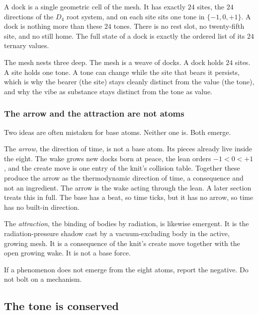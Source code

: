 \begin{definition}[A dock]
A dock is a single geometric cell of the mesh. It has exactly $24$ sites, the $24$ directions of the $D_4$ root system, and on each site sits one tone in $\{-1, 0, +1\}$. A dock is nothing more than these $24$ tones. There is no rest slot, no twenty-fifth site, and no still home. The full state of a dock is exactly the ordered list of its $24$ ternary values.
\end{definition}

The mesh nests three deep. The mesh is a weave of docks. A dock holds $24$ sites. A site holds one tone. A tone can change while the site that bears it persists, which is why the bearer (the site) stays cleanly distinct from the value (the tone), and why the vibe as substance stays distinct from the tone as value.

\subsubsection{The arrow and the attraction are not atoms}

Two ideas are often mistaken for base atoms. Neither one is. Both emerge.

The \emph{arrow}, the direction of time, is not a base atom. Its pieces already live inside the eight. The wake grows new docks born at peace, the lean orders $-1 < 0 < +1$, and the create move is one entry of the knit's collision table. Together these produce the arrow as the thermodynamic direction of time, a consequence and not an ingredient. The arrow is the wake acting through the lean. A later section treats this in full. The base has a beat, so time ticks, but it has no arrow, so time has no built-in direction.

The \emph{attraction}, the binding of bodies by radiation, is likewise emergent. It is the radiation-pressure shadow cast by a vacuum-excluding body in the active, growing mesh. It is a consequence of the knit's create move together with the open growing wake. It is not a base force.

\begin{principle}
If a phenomenon does not emerge from the eight atoms, report the negative. Do not bolt on a mechanism.
\end{principle}

\subsection{The tone is conserved}

